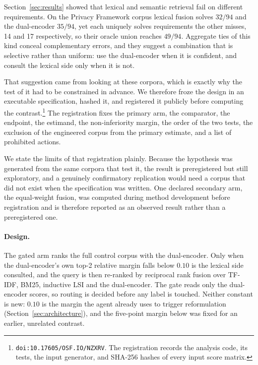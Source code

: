 \documentclass[a4paper,fleqn]{cas-sc}
\begin{document}
Section~\ref{sec:results} showed that lexical and semantic retrieval fail on different requirements. On the Privacy Framework corpus lexical fusion solves $32/94$ and the dual-encoder $35/94$, yet each uniquely solves requirements the other misses, 14 and 17 respectively, so their oracle union reaches $49/94$. Aggregate ties of this kind conceal complementary errors, and they suggest a combination that is selective rather than uniform: use the dual-encoder when it is confident, and consult the lexical side only when it is not.

That suggestion came from looking at these corpora, which is exactly why the test of it had to be constrained in advance. We therefore froze the design in an executable specification, hashed it, and registered it publicly before computing the contrast.\footnote{\texttt{doi:10.17605/OSF.IO/NZXRV}. The registration records the analysis code, its tests, the input generator, and SHA-256 hashes of every input score matrix.} The registration fixes the primary arm, the comparator, the endpoint, the estimand, the non-inferiority margin, the order of the two tests, the exclusion of the engineered corpus from the primary estimate, and a list of prohibited actions.

We state the limits of that registration plainly. Because the hypothesis was generated from the same corpora that test it, the result is preregistered but still exploratory, and a genuinely confirmatory replication would need a corpus that did not exist when the specification was written. One declared secondary arm, the equal-weight fusion, was computed during method development before registration and is therefore reported as an observed result rather than a preregistered one.

\paragraph{Design.}
The gated arm ranks the full control corpus with the dual-encoder. Only when the dual-encoder's own top-2 relative margin falls below $0.10$ is the lexical side consulted, and the query is then re-ranked by reciprocal rank fusion over TF-IDF, BM25, inductive LSI and the dual-encoder. The gate reads only the dual-encoder scores, so routing is decided before any label is touched. Neither constant is new: $0.10$ is the margin the agent already uses to trigger reformulation (Section~\ref{sec:architecture}), and the five-point margin below was fixed for an earlier, unrelated contrast.
\end{document}
